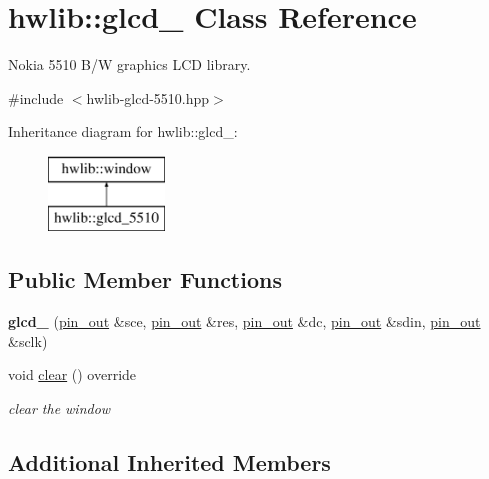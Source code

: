 \hypertarget{classhwlib_1_1glcd__5510}{}\section{hwlib\+:\+:glcd\+\_ Class Reference}
\label{classhwlib_1_1glcd__5510}


Nokia 5510 B/W graphics L\+CD library.  




{\ttfamily \#include $<$hwlib-\/glcd-\/5510.\+hpp$>$}

Inheritance diagram for hwlib\+:\+:glcd\+\_\+:\begin{figure}[H]
\begin{center}
\leavevmode
\includegraphics[height=2.000000cm]{classhwlib_1_1glcd__5510}
\end{center}
\end{figure}
\subsection*{Public Member Functions}
\begin{DoxyCompactItemize}
\item 
{\bfseries glcd\+\_} (\hyperlink{classhwlib_1_1pin__out}{pin\+\_\+out} \&sce, \hyperlink{classhwlib_1_1pin__out}{pin\+\_\+out} \&res, \hyperlink{classhwlib_1_1pin__out}{pin\+\_\+out} \&dc, \hyperlink{classhwlib_1_1pin__out}{pin\+\_\+out} \&sdin, \hyperlink{classhwlib_1_1pin__out}{pin\+\_\+out} \&sclk)\hypertarget{classhwlib_1_1glcd__5510_a689cb8a2f60f76f087b83626b2ca931a}{}\label{classhwlib_1_1glcd__5510_a689cb8a2f60f76f087b83626b2ca931a}

\item 
void \hyperlink{classhwlib_1_1glcd__5510_a533b2663e151bee909543d0038b2cb4d}{clear} () override
\begin{DoxyCompactList}\small\item\em clear the window \end{DoxyCompactList}\end{DoxyCompactItemize}
\subsection*{Additional Inherited Members}


